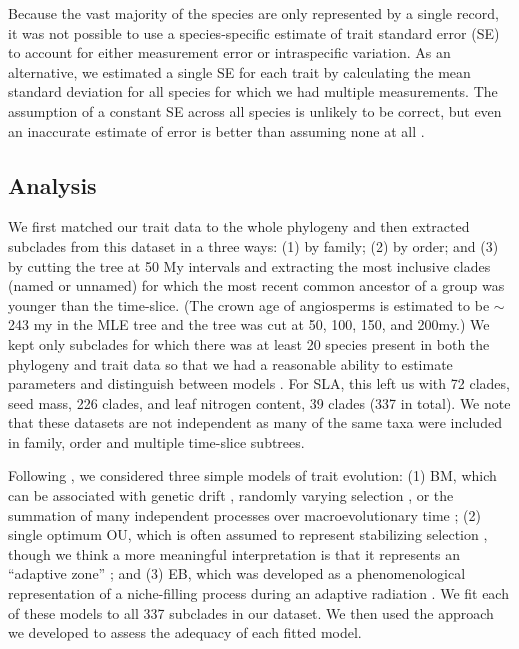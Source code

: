 Because the vast majority of the species are only represented by a single
record, it was not possible to use a species-specific estimate of
trait standard error (SE) to account for either measurement error or
intraspecific variation.  As an alternative, we estimated a single SE for each trait
by calculating the mean
standard deviation for all species for which we had multiple
measurements. The assumption of a constant SE across all species is
unlikely to be correct, but even an
inaccurate estimate of error is better than assuming none at all
\citep{Hansen2012SysBio}. 

\subsection{Analysis}

We first matched our trait data to the whole phylogeny and then extracted subclades from this dataset in a three ways: (1) by family; (2) by order; and (3) by cutting the tree at 50 My intervals and extracting the most inclusive clades (named or unnamed) for which the most recent common ancestor of a group was younger than the time-slice. 
(The crown age of angiosperms is estimated to be $\sim$243 my in the MLE tree and the tree was cut at 50, 100, 150, and 200my.) We kept only subclades for which there was at least 20 species present in both the phylogeny and trait data so that we had a reasonable ability to estimate parameters and distinguish between models \citep{Boettiger2012, SlaterPennell}. 
For SLA, this left us with 72 clades, seed mass, 226 clades, and leaf nitrogen content, 39 clades (337 in total). We note that these datasets are not independent as many of the same taxa were included in family, order and multiple time-slice subtrees. 

Following \citet{Harmon2010}, we considered three simple models of trait evolution: (1) BM, which can be associated with genetic drift \citep{Lande1976, Felsenstein1988, LynchHill1986, Lynch1990, HansenMartins1996}, randomly varying selection \citep{Felsenstein1973}, or the summation of many independent processes over macroevolutionary time \citep{HansenMartins1996, Uyeda2011, PennellPE}; (2) single optimum OU, which is often assumed to represent stabilizing selection \citep[following][]{Lande1976}, though we think a more meaningful interpretation is that it represents an ``adaptive zone'' \citep{Hansen2012book, PennellHarmon}; and (3) EB, which was developed as a phenomenological representation of a niche-filling process during an adaptive radiation \citep{Blomberg2003, Harmon2010}. We fit each of these models to all 337 subclades in our dataset. We then used the approach we developed to assess the adequacy of each fitted model. 

